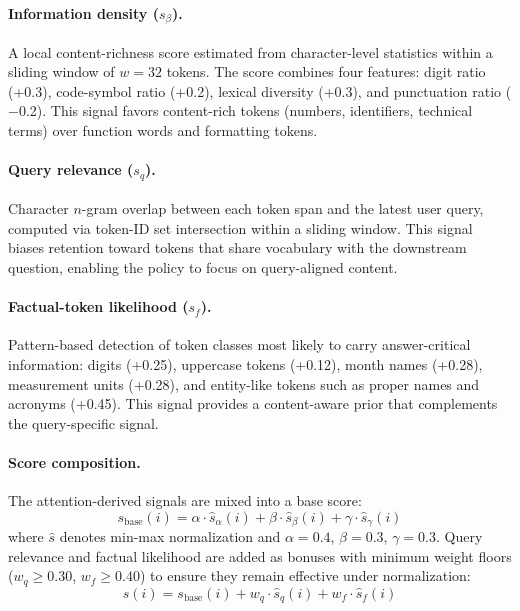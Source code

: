 \documentclass[runningheads]{llncs}
\begin{document}
\paragraph{Information density ($s_\beta$).}
A local content-richness score estimated from character-level statistics
within a sliding window of $w{=}32$ tokens.
The score combines four features: digit ratio (+0.3), code-symbol
ratio (+0.2), lexical diversity (+0.3), and punctuation ratio ($-$0.2).
This signal favors content-rich tokens (numbers, identifiers, technical
terms) over function words and formatting tokens.

\paragraph{Query relevance ($s_q$).}
Character $n$-gram overlap between each token span and the latest user
query, computed via token-ID set intersection within a sliding window.
This signal biases retention toward tokens that share vocabulary with the
downstream question, enabling the policy to focus on query-aligned content.

\paragraph{Factual-token likelihood ($s_f$).}
Pattern-based detection of token classes most likely to carry
answer-critical information: digits (+0.25), uppercase tokens (+0.12),
month names (+0.28), measurement units (+0.28), and entity-like tokens
such as proper names and acronyms (+0.45).
This signal provides a content-aware prior that complements the
query-specific signal.

\paragraph{Score composition.}
The attention-derived signals are mixed into a base score:
\begin{equation}
  s_{\text{base}}(i) = \alpha \cdot \hat{s}_\alpha(i) + \beta \cdot \hat{s}_\beta(i) + \gamma \cdot \hat{s}_\gamma(i)
\end{equation}
where $\hat{s}$ denotes min-max normalization and $\alpha{=}0.4$,
$\beta{=}0.3$, $\gamma{=}0.3$.
Query relevance and factual likelihood are added as bonuses with minimum
weight floors ($w_q{\geq}0.30$, $w_f{\geq}0.40$) to ensure they remain
effective under normalization:
\begin{equation}
  s(i) = s_{\text{base}}(i) + w_q \cdot \hat{s}_q(i) + w_f \cdot \hat{s}_f(i)
\end{equation}
\end{document}
